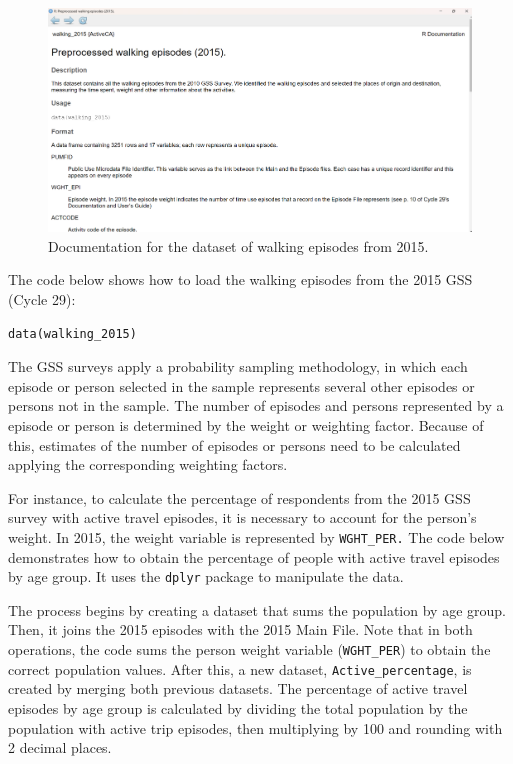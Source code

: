 \documentclass[Royal,times,sageh]{sagej}
\begin{document}
\begin{figure}

{\centering \includegraphics[width=1\linewidth]{Manuscript-figures/walking-2015-documentation} 

}

\caption{Documentation for the dataset of walking episodes from 2015.}\label{fig:walking_documentation}
\end{figure}

The code below shows how to load the walking episodes from the 2015 GSS
(Cycle 29):

\begin{verbatim}
data(walking_2015)
\end{verbatim}

The GSS surveys apply a probability sampling methodology, in which each
episode or person selected in the sample represents several other
episodes or persons not in the sample. The number of episodes and
persons represented by a episode or person is determined by the weight
or weighting factor. Because of this, estimates of the number of
episodes or persons need to be calculated applying the corresponding
weighting factors.

For instance, to calculate the percentage of respondents from the 2015
GSS survey with active travel episodes, it is necessary to account for
the person's weight. In 2015, the weight variable is represented by
\texttt{WGHT\_PER.} The code below demonstrates how to obtain the
percentage of people with active travel episodes by age group. It uses
the \texttt{dplyr} package \citep{dplyr2023} to manipulate the data.

The process begins by creating a dataset that sums the population by age
group. Then, it joins the 2015 episodes with the 2015 Main File. Note
that in both operations, the code sums the person weight variable
(\texttt{WGHT\_PER}) to obtain the correct population values. After
this, a new dataset, \texttt{Active\_percentage}, is created by merging
both previous datasets. The percentage of active travel episodes by age
group is calculated by dividing the total population by the population
with active trip episodes, then multiplying by 100 and rounding with 2
decimal places.
\end{document}
